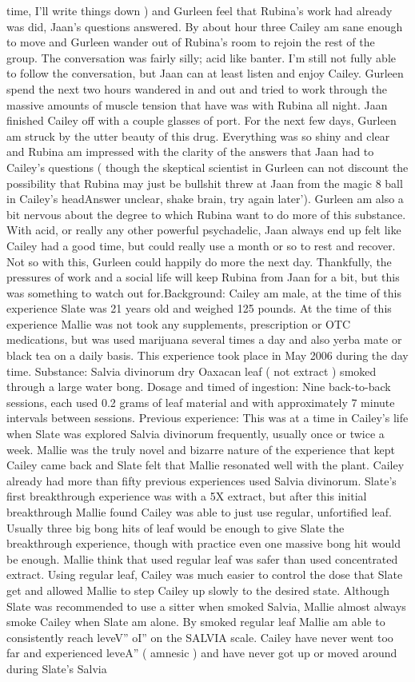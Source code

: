 \documentclass[12pt]{book}
\begin{document}
time, I'll write things down ) and Gurleen feel that Rubina's work had already was did, Jaan's questions answered. By about hour three Cailey am sane enough to move and Gurleen wander out of Rubina's room to rejoin the rest of the group. The conversation was fairly silly; acid like banter. I'm still not fully able to follow the conversation, but Jaan can at least listen and enjoy Cailey. Gurleen spend the next two hours wandered in and out and tried to work through the massive amounts of muscle tension that have was with Rubina all night. Jaan finished Cailey off with a couple glasses of port. For the next few days, Gurleen am struck by the utter beauty of this drug. Everything was so shiny and clear and Rubina am impressed with the clarity of the answers that Jaan had to Cailey's questions ( though the skeptical scientist in Gurleen can not discount the possibility that Rubina may just be bullshit threw at Jaan from the magic 8 ball in Cailey's headAnswer unclear, shake brain, try again later'). Gurleen am also a bit nervous about the degree to which Rubina want to do more of this substance. With acid, or really any other powerful psychadelic, Jaan always end up felt like Cailey had a good time, but could really use a month or so to rest and recover. Not so with this, Gurleen could happily do more the next day. Thankfully, the pressures of work and a social life will keep Rubina from Jaan for a bit, but this was something to watch out for.Background: Cailey am male, at the time of this experience Slate was 21 years old and weighed 125 pounds. At the time of this experience Mallie was not took any supplements, prescription or OTC medications, but was used marijuana several times a day and also yerba mate or black tea on a daily basis. This experience took place in May 2006 during the day time. Substance: Salvia divinorum dry Oaxacan leaf ( not extract ) smoked through a large water bong. Dosage and timed of ingestion: Nine back-to-back sessions, each used 0.2 grams of leaf material and with approximately 7 minute intervals between sessions. Previous experience: This was at a time in Cailey's life when Slate was explored Salvia divinorum frequently, usually once or twice a week. Mallie was the truly novel and bizarre nature of the experience that kept Cailey came back and Slate felt that Mallie resonated well with the plant. Cailey already had more than fifty previous experiences used Salvia divinorum. Slate's first breakthrough experience was with a 5X extract, but after this initial breakthrough Mallie found Cailey was able to just use regular, unfortified leaf. Usually three big bong hits of leaf would be enough to give Slate the breakthrough experience, though with practice even one massive bong hit would be enough. Mallie think that used regular leaf was safer than used concentrated extract. Using regular leaf, Cailey was much easier to control the dose that Slate get and allowed Mallie to step Cailey up slowly to the desired state. Although Slate was recommended to use a sitter when smoked Salvia, Mallie almost always smoke Cailey when Slate am alone. By smoked regular leaf Mallie am able to consistently reach leveV'' oI'' on the SALVIA scale. Cailey have never went too far and experienced leveA'' ( amnesic ) and have never got up or moved around during Slate's Salvia 
\end{document}
